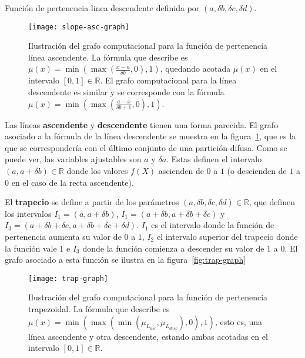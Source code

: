 \begin{marginfigure}
	\caption{Función de pertenencia linea descendente definida por $(a, \delta b, \delta c, \delta d)$.}
	\label{fig:trapz}
\end{marginfigure}

\begin{figure}
	\centering
	\texttt{[image: slope-asc-graph]}
	\caption[Grafo computacional de la función de pertenencia para la línea ascendente]{Ilustración del grafo computacional para la función de pertenencia línea ascendente. La fórmula que describe es $\mu(x) = \min(\max(\frac{x - a}{\delta b}, 0), 1)$, quedando acotada $\mu(x)$ en el intervalo $[0, 1] \in \mathbb{R}$. El grafo computacional para la línea descendente es similar y se corresponde con la fórmula $\mu(x) = \min(\max(\frac{a - x}{\delta b + 1}, 0), 1)$.}
	\label{fig:slope-asc-grap}
\end{figure}

Las líneas \textbf{ascendente} y \textbf{descendente} tienen una forma parecida. El grafo asociado a la fórmula de la línea descendente se muestra en la figura~\ref{fig:slope-asc-grap}, que es la que se correspondería con el último conjunto de una partición difusa. Como se puede ver, las variables ajustables son $a$ y $\delta a$. Estas definen el intervalo $(a, a + \delta b) \in \mathbb{R}$ donde los valores $f(X)$ ascienden de $0$ a $1$ (o descienden de $1$ a $0$ en el caso de la recta ascendente).

El \textbf{trapecio} se define a partir de los parámetros $(a, \delta b, \delta c, \delta d) \in \mathbb{R}$, que definen los intervalos $I_1 = (a, a + \delta b)$, $I_1 = (a + \delta b, a + \delta b + \delta c)$ y $I_3 = (a + \delta b + \delta c, a + \delta b + \delta c + \delta d)$. $I_1$ es el intervalo donde la función de pertenencia aumenta su valor de $0$ a $1$, $I_2$ el intervalo superior del trapecio donde la función vale $1$ e $I_3$ donde la función comienza a descender su valor de $1$ a $0$. El grafo asociado a esta función se ilustra en la figura~\ref{fig:trap-graph}

\begin{figure}
	\centering
	\texttt{[image: trap-graph]}
	\caption[Grafo computacional de la función de pertenencia para el trapecio]{Ilustración del grafo computacional para la función de pertenencia trapezoidal. La fórmula que describe es $\mu(x) = \min(\max(\min(\mu_{L_{asc}}, \mu_{L_{desc}}), 0), 1)$, esto es, una línea ascendente y otra descendente, estando ambas acotadas en el intervalo $[0, 1] \in \mathbb{R}$.}
	\label{fig:trap-grap}
\end{figure}

